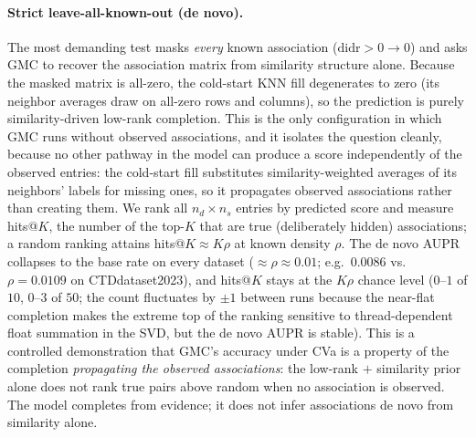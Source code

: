 \documentclass[webpdf,modern,large]{oup-authoring-template}
\begin{document}
\paragraph{Strict leave-all-known-out (de novo).} The most demanding test masks \emph{every} known association ($\mathrm{didr}>0 \rightarrow 0$) and asks GMC to recover the association matrix from similarity structure alone. Because the masked matrix is all-zero, the cold-start KNN fill degenerates to zero (its neighbor averages draw on all-zero rows and columns), so the prediction is purely similarity-driven low-rank completion. This is the only configuration in which GMC runs without observed associations, and it isolates the question cleanly, because no other pathway in the model can produce a score independently of the observed entries: the cold-start fill substitutes similarity-weighted averages of its neighbors' labels for missing ones, so it propagates observed associations rather than creating them. We rank all $n_d \times n_s$ entries by predicted score and measure hits@$K$, the number of the top-$K$ that are true (deliberately hidden) associations; a random ranking attains hits@$K \approx K\rho$ at known density $\rho$. The de novo AUPR collapses to the base rate on every dataset ($\approx \rho \approx 0.01$; e.g.\ $0.0086$ vs.\ $\rho = 0.0109$ on CTDdataset2023), and hits@$K$ stays at the $K\rho$ chance level ($0$--$1$ of $10$, $0$--$3$ of $50$; the count fluctuates by $\pm 1$ between runs because the near-flat completion makes the extreme top of the ranking sensitive to thread-dependent float summation in the SVD, but the de novo AUPR is stable). This is a controlled demonstration that GMC's accuracy under CVa is a property of the completion \emph{propagating the observed associations}: the low-rank $+$ similarity prior alone does not rank true pairs above random when no association is observed. The model completes from evidence; it does not infer associations de novo from similarity alone.
\end{document}
